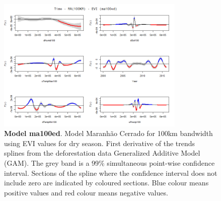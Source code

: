 \begin{table}


\begin{figure}[H]
 \centering
        \centering
        \includegraphics[width=0.8\textwidth]{ma100ed.png} %
        \caption[Model Cerrado Maranhão for 100km bandwidth using EVI values for dry season. First derivative of the trends splines from the deforestation data Generalized Additive Model (GAM)]{\textbf{Model ma100ed}. Model Maranhão Cerrado for 100km bandwidth using EVI values for dry season. First derivative of the trends splines from the deforestation data Generalized Additive Model (GAM). The grey band is a 99\% simultaneous point-wise confidence interval. Sections of the spline where the confidence interval does not include zero are indicated by coloured sections. Blue colour means positive values and red colour means negative values.}
\end{figure}
\end{table}

